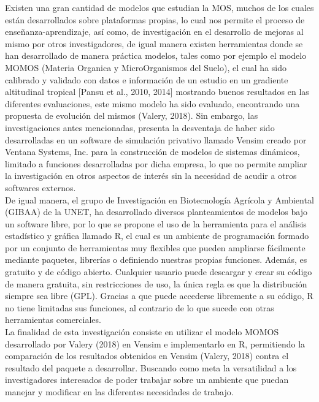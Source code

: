 Existen una gran cantidad de modelos que estudian la MOS, muchos de los cuales están desarrollados sobre plataformas propias, lo cual nos permite el proceso de enseñanza-aprendizaje, así como, de investigación en el desarrollo de mejoras al mismo por otros investigadores, de igual manera existen herramientas donde se han desarrollado de manera práctica modelos, tales como por ejemplo el modelo MOMOS (Materia Organica y MicroOrganismos del Suelo), el cual ha sido calibrado y validado con datos e información de un estudio en un gradiente altitudinal tropical [Pansu et al., 2010, 2014] mostrando buenos resultados en las diferentes evaluaciones, este mismo modelo ha sido evaluado, encontrando una propuesta de evolución del mismos (Valery, 2018). Sin embargo, las investigaciones antes mencionadas, presenta la desventaja de haber sido desarrolladas en un software de simulación privativo llamado Vensim creado por Ventana Systems, Inc. para la construcción de modelos de sistemas dinámicos, limitado a funciones desarrolladas por dicha empresa, lo que no permite ampliar la investigación en otros aspectos de interés sin la necesidad de acudir a otros softwares externos.\\

De igual manera, el grupo de Investigación en Biotecnología Agrícola y Ambiental (GIBAA) de la UNET, ha desarrollado diversos planteamientos de modelos bajo un software libre, por lo que se propone el uso de la herramienta para el análisis estadístico y gráfica llamado R, el cual es un ambiente de programación formado por un conjunto de herramientas muy flexibles que pueden ampliarse fácilmente mediante paquetes, librerías o definiendo nuestras propias funciones. Además, es gratuito y de código abierto. Cualquier usuario puede descargar y crear su código de manera gratuita, sin restricciones de uso, la única regla es que la distribución siempre sea libre (GPL). Gracias a que puede accederse libremente a su código, R no tiene limitadas sus funciones, al contrario de lo que sucede con otras herramientas comerciales. \\

La finalidad de esta investigación consiste en utilizar el modelo MOMOS desarrollado por Valery (2018) en Vensim e implementarlo en R, permitiendo la comparación de los resultados obtenidos en Vensim (Valery, 2018) contra el resultado del paquete a desarrollar. Buscando como meta la versatilidad a los investigadores interesados de poder trabajar sobre un ambiente que puedan manejar y modificar en las diferentes necesidades de trabajo.\\




